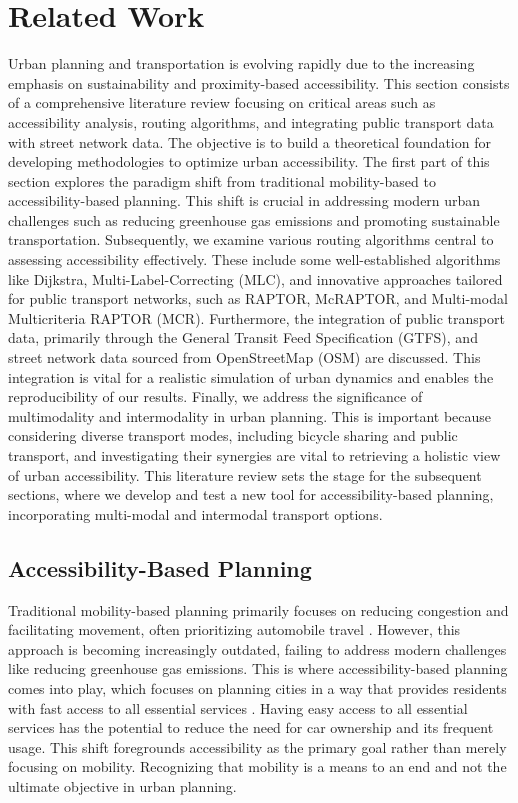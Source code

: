 \clearpage
\section{Related Work}
\label{sec:related_work}

Urban planning and transportation is evolving rapidly due to the increasing emphasis on sustainability and proximity-based accessibility. 
This section consists of a comprehensive literature review focusing on critical areas such as accessibility analysis, routing algorithms, and integrating public transport data with street network data. 
The objective is to build a theoretical foundation for developing methodologies to optimize urban accessibility. 
The first part of this section explores the paradigm shift from traditional mobility-based to accessibility-based planning.
This shift is crucial in addressing modern urban challenges such as reducing greenhouse gas emissions and promoting sustainable transportation. 
Subsequently, we examine various routing algorithms central to assessing accessibility effectively. 
These include some well-established algorithms like Dijkstra, Multi-Label-Correcting (MLC), and innovative approaches tailored for public transport networks, such as RAPTOR, McRAPTOR, and Multi-modal Multicriteria RAPTOR (MCR). 
Furthermore, the integration of public transport data, primarily through the General Transit Feed Specification (GTFS), and street network data sourced from OpenStreetMap (OSM) are discussed. 
This integration is vital for a realistic simulation of urban dynamics and enables the reproducibility of our results. 
Finally, we address the significance of multimodality and intermodality in urban planning.
This is important because considering diverse transport modes, including bicycle sharing and public transport, and investigating their synergies are vital to retrieving a holistic view of urban accessibility.
This literature review sets the stage for the subsequent sections, where we develop and test a new tool for accessibility-based planning, incorporating multi-modal and intermodal transport options.

\subsection{Accessibility-Based Planning}
\label{subsec:accessibility_based_planning}

Traditional mobility-based planning primarily focuses on reducing congestion and facilitating movement, often prioritizing automobile travel .
However, this approach is becoming increasingly outdated, failing to address modern challenges like reducing greenhouse gas emissions.
This is where accessibility-based planning comes into play, which focuses on planning cities in a way that provides residents with fast access to all essential services .
Having easy access to all essential services has the potential to reduce the need for car ownership and its frequent usage.
This shift foregrounds accessibility as the primary goal rather than merely focusing on mobility. 
Recognizing that mobility is a means to an end and not the ultimate objective in urban planning. 


